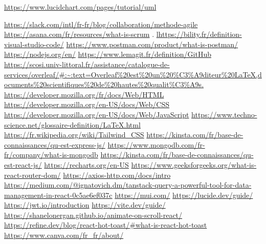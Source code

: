 
\begin{thebibliography}{99}

 \url{https://www.lucidchart.com/pages/tutorial/uml}  


  \url{https://slack.com/intl/fr-fr/blog/collaboration/methode-agile} 
  \url{https://asana.com/fr/resources/what-is-scrum}
.  
  \url{lhttps://bility.fr/definition-visual-studio-code/}
\url{https://www.postman.com/product/what-is-postman/}
\url{https://nodejs.org/en/}
\url{https://www.lemagit.fr/definition/GitHub}
\url{https://scosi.univ-littoral.fr/assistance/catalogue-de-services/overleaf/#:~:text=Overleaf%20est%20un%20%C3%A9diteur%20LaTeX,documents%20scientifiques%20de%20hautes%20qualit%C3%A9s.}
\url{https://developer.mozilla.org/fr/docs/Web/HTML}
\url{https://developer.mozilla.org/en-US/docs/Web/CSS}
\url{https://developer.mozilla.org/en-US/docs/Web/JavaScript}
\url{https://www.techno-science.net/glossaire-definition/LaTeX.html}
\url{https://fr.wikipedia.org/wiki/Tailwind_CSS}
\url{https://kinsta.com/fr/base-de-connaissances/qu-est-express-js/}
\url{https://www.mongodb.com/fr-fr/company/what-is-mongodb}
\url{https://kinsta.com/fr/base-de-connaissances/qu-est-react-js/}
\url{https://recharts.org/en-US}
\url{https://www.geeksforgeeks.org/what-is-react-router-dom/}
\url{https://axios-http.com/docs/intro}
\url{https://medium.com/@ignatovich.dm/tanstack-query-a-powerful-tool-for-data-management-in-react-0c5ae6ef037c}
\url{https://mui.com/}
\url{https://lucide.dev/guide/}
\url{https://jwt.io/introduction}
\url{https://vite.dev/guide/}
\url{https://shanelonergan.github.io/animate-on-scroll-react/}
\url{https://refine.dev/blog/react-hot-toast/#what-is-react-hot-toast}
\url{https://www.canva.com/fr_fr/about/}


\end{thebibliography}
